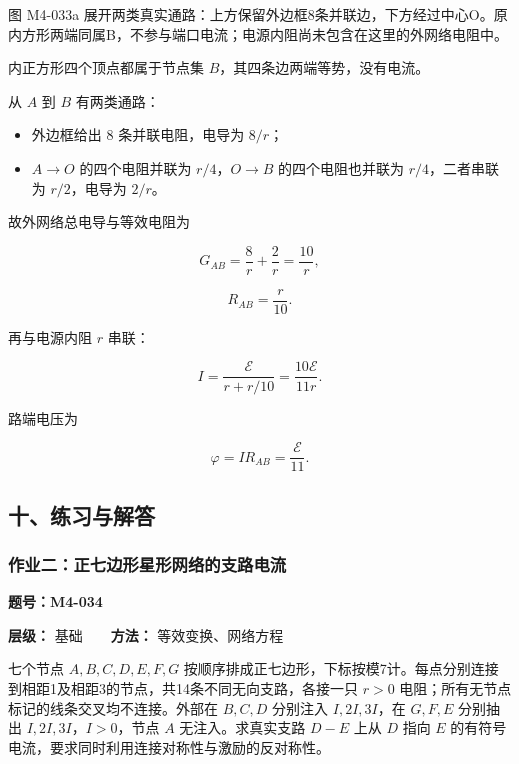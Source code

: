 图 M4-033a
展开两类真实通路：上方保留外边框8条并联边，下方经过中心O。原内方形两端同属B，不参与端口电流；电源内阻尚未包含在这里的外网络电阻中。

内正方形四个顶点都属于节点集 \(B\)，其四条边两端等势，没有电流。

从 \(A\) 到 \(B\) 有两类通路：

\begin{itemize}
\tightlist
\item
  外边框给出 \(8\) 条并联电阻，电导为 \(8/r\)；
\item
  \(A\to O\) 的四个电阻并联为 \(r/4\)，\(O\to B\) 的四个电阻也并联为
  \(r/4\)，二者串联为 \(r/2\)，电导为 \(2/r\)。
\end{itemize}

故外网络总电导与等效电阻为

\[
G_{AB}=\frac8r+\frac2r=\frac{10}{r},
\]

\[
\boxed{R_{AB}=\frac{r}{10}}.
\]

再与电源内阻 \(r\) 串联：

\[
\boxed{
I=\frac{\mathcal E}{r+r/10}
=\frac{10\mathcal E}{11r}
}.
\]

路端电压为

\[
\varphi=IR_{AB}=\frac{\mathcal E}{11}.
\]

\subsection{十、练习与解答}\label{m4:ux5341ux7ec3ux4e60ux4e0eux89e3ux7b54}

\par{}
\noindent\begin{minipage}{\linewidth}

\subsubsection{作业二：正七边形星形网络的支路电流}\label{m4:ux4f5cux4e1aux4e8cux6b63ux4e03ux8fb9ux5f62ux661fux5f62ux7f51ux7edcux7684ux652fux8defux7535ux6d41}

\textbf{题号：M4-034}

\textbf{层级：} 基础　　\textbf{方法：} 等效变换、网络方程

七个节点 \(A,B,C,D,E,F,G\)
按顺序排成正七边形，下标按模7计。每点分别连接到相距1及相距3的节点，共14条不同无向支路，各接一只
\(r>0\) 电阻；所有无节点标记的线条交叉均不连接。外部在 \(B,C,D\)
分别注入 \(I,2I,3I\)，在 \(G,F,E\) 分别抽出 \(I,2I,3I\)，\(I>0\)，节点
\(A\) 无注入。求真实支路 \(D-E\) 上从 \(D\) 指向 \(E\)
的有符号电流，要求同时利用连接对称性与激励的反对称性。

\end{minipage}\par

